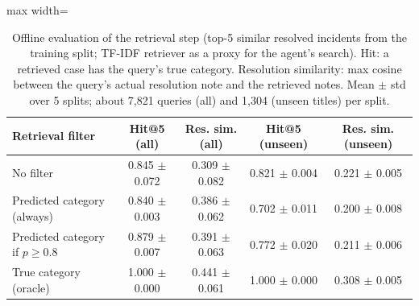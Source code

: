 \begin{table}[!t]
\centering
\caption{Offline evaluation of the retrieval step (top-5 similar resolved incidents from the training split; TF-IDF retriever as a proxy for the agent's search). Hit: a retrieved case has the query's true category. Resolution similarity: max cosine between the query's actual resolution note and the retrieved notes. Mean $\pm$ std over 5 splits; about 7,821 queries (all) and 1,304 (unseen titles) per split.}
\label{tab:retrieval}
\footnotesize
\begin{adjustbox}{max width=\textwidth}
\begin{tabular}{lcccc}
\hline
Retrieval filter & Hit@5 (all) & Res. sim. (all) & Hit@5 (unseen) & Res. sim. (unseen) \\
\hline
No filter & 0.845 $\pm$ 0.072 & 0.309 $\pm$ 0.082 & 0.821 $\pm$ 0.004 & 0.221 $\pm$ 0.005 \\
Predicted category (always) & 0.840 $\pm$ 0.003 & 0.386 $\pm$ 0.062 & 0.702 $\pm$ 0.011 & 0.200 $\pm$ 0.008 \\
Predicted category if $p\ge0.8$ & 0.879 $\pm$ 0.007 & 0.391 $\pm$ 0.063 & 0.772 $\pm$ 0.020 & 0.211 $\pm$ 0.006 \\
True category (oracle) & 1.000 $\pm$ 0.000 & 0.441 $\pm$ 0.061 & 1.000 $\pm$ 0.000 & 0.308 $\pm$ 0.005 \\
\hline
\end{tabular}
\end{adjustbox}
\end{table}
